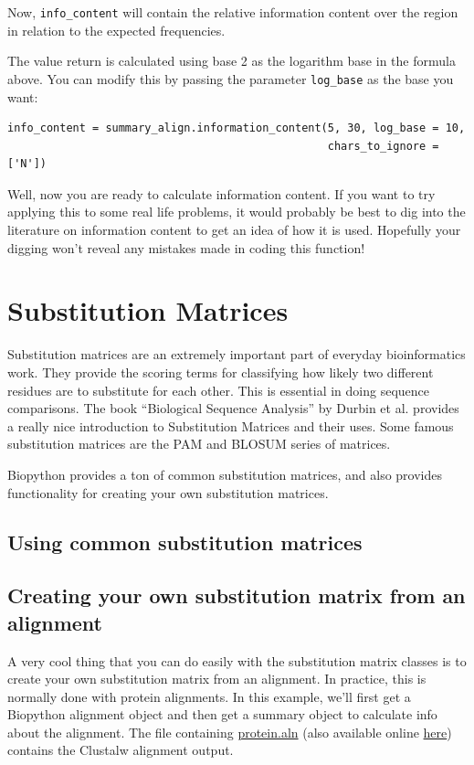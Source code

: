 \documentclass{report}
\begin{document}
Now, \verb|info_content| will contain the relative information content over the region in relation to the expected frequencies.

The value return is calculated using base 2 as the logarithm base in the formula above. You can modify this by passing the parameter \verb|log_base| as the base you want:

\begin{verbatim}
info_content = summary_align.information_content(5, 30, log_base = 10,
                                                 chars_to_ignore = ['N'])
\end{verbatim}

Well, now you are ready to calculate information content. If you want to try applying this to some real life problems, it would probably be best to dig into the literature on information content to get an idea of how it is used. Hopefully your digging won't reveal any mistakes made in coding this function!

\section{Substitution Matrices}
\label{sec:sub_matrix}

Substitution matrices are an extremely important part of everyday bioinformatics work. They provide the scoring terms for classifying how likely two different residues are to substitute for each other. This is essential in doing sequence comparisons. The book ``Biological Sequence Analysis'' by Durbin et al. provides a really nice introduction to Substitution Matrices and their uses. Some famous substitution matrices are the PAM and BLOSUM series of matrices.

Biopython provides a ton of common substitution matrices, and also provides functionality for creating your own substitution matrices.

\subsection{Using common substitution matrices}

\subsection{Creating your own substitution matrix from an alignment}
\label{sec:subs_mat_ex}

A very cool thing that you can do easily with the substitution matrix
classes is to create your own substitution matrix from an
alignment. In practice, this is normally done with protein
alignments. In this example, we'll first get a Biopython alignment
object and then get a summary object to calculate info about the
alignment. The file containing \href{examples/protein.aln}{protein.aln}
(also available online
\href{http://biopython.org/DIST/docs/tutorial/examples/protein.aln}{here})
contains the Clustalw alignment output.
\end{document}
